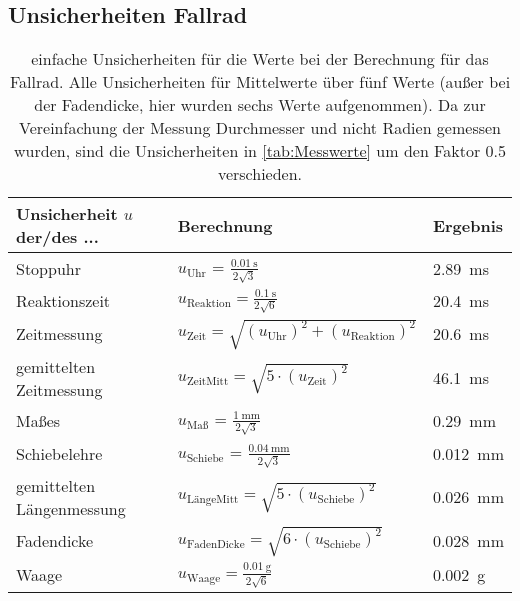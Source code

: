 

\subsection{Unsicherheiten Fallrad}

\begin{table}[ht]
	\centering
	\caption{einfache Unsicherheiten für die Werte bei der Berechnung für das Fallrad. Alle Unsicherheiten für Mittelwerte über fünf Werte (außer bei der Fadendicke, hier wurden sechs Werte aufgenommen). Da zur Vereinfachung der Messung Durchmesser und nicht Radien gemessen wurden, sind die Unsicherheiten in \ref{tab:Messwerte} um den Faktor 0.5 verschieden.}
	\begin{tabular}{l|l|l}
		{Unsicherheit $u$ der/des ...} & {Berechnung}  & {Ergebnis}\\
		\hline 
		{Stoppuhr} &  {$u_\text{Uhr}$ = $\frac{\SI{0,01}{\second}}{2\sqrt{3}}$} & {\SI{2,89}{\milli\second}} \\
		{Reaktionszeit} & {$u_\text{Reaktion} = \frac{\SI{0,1}{\second}}{2\sqrt{6}}$} & {\SI{20,4}{\milli\second}} \\
		{Zeitmessung} & {$u_\text{Zeit} = \sqrt{\left( u_\text{Uhr}\right) ^2+\left( u_\text{Reaktion}\right) ^2}$} & {\SI{20,6}{\milli\second}} \\
		{gemittelten Zeitmessung} & {$u_\text{ZeitMitt} = \sqrt{5\cdot\left(u_\text{Zeit}\right) ^2}$} & {\SI{46,1}{\milli\second}} \\
		\hline 
		{Maßes} &  {$u_\text{Maß}$ = $\frac{\SI{1}{\mm}}{2\sqrt{3}}$} & {\SI{0,29}{\mm}} \\
		{Schiebelehre} &  {$u_\text{Schiebe}$ = $\frac{\SI{0,04}{\mm}}{2\sqrt{3}}$} & {\SI{0,012}{\mm}} \\
		{gemittelten Längenmessung} &  {$u_\text{LängeMitt} = \sqrt{5\cdot\left(u_\text{Schiebe}\right) ^2}$} & {\SI{0,026}{\mm}} \\
		{Fadendicke} &  {$u_\text{FadenDicke} = \sqrt{6\cdot\left(u_\text{Schiebe}\right) ^2}$} & {\SI{0,028}{\mm}} \\
		\hline
		{Waage} & {$u_\text{Waage} = \frac{\SI{0,01}{\g}}{2\sqrt{6}}$} & \SI{0,002}{\g}{}
	\end{tabular}
\end{table}


